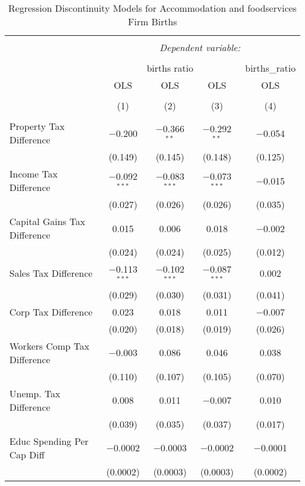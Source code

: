 
\begin{table}[!htbp] \centering 
  \caption{Regression Discontinuity Models for  Accommodation and foodservices Firm Births} 
  \label{72rd} 
\begin{tabular}{@{\extracolsep{5pt}}lcccc} 
\\[-1.8ex]\hline 
\hline \\[-1.8ex] 
 & \multicolumn{4}{c}{\textit{Dependent variable:}} \\ 
\cline{2-5} 
\\[-1.8ex] & \multicolumn{3}{c}{births ratio} & births\_ratio \\ 
 & OLS & OLS & OLS & OLS \\ 
\\[-1.8ex] & (1) & (2) & (3) & (4)\\ 
\hline \\[-1.8ex] 
 Property Tax Difference & $-$0.200 & $-$0.366$^{**}$ & $-$0.292$^{**}$ & $-$0.054 \\ 
  & (0.149) & (0.145) & (0.148) & (0.125) \\ 
  Income Tax Difference & $-$0.092$^{***}$ & $-$0.083$^{***}$ & $-$0.073$^{***}$ & $-$0.015 \\ 
  & (0.027) & (0.026) & (0.026) & (0.035) \\ 
  Capital Gains Tax Difference & 0.015 & 0.006 & 0.018 & $-$0.002 \\ 
  & (0.024) & (0.024) & (0.025) & (0.012) \\ 
  Sales Tax Difference & $-$0.113$^{***}$ & $-$0.102$^{***}$ & $-$0.087$^{***}$ & 0.002 \\ 
  & (0.029) & (0.030) & (0.031) & (0.041) \\ 
  Corp Tax Difference & 0.023 & 0.018 & 0.011 & $-$0.007 \\ 
  & (0.020) & (0.018) & (0.019) & (0.026) \\ 
  Workers Comp Tax Difference & $-$0.003 & 0.086 & 0.046 & 0.038 \\ 
  & (0.110) & (0.107) & (0.105) & (0.070) \\ 
  Unemp. Tax Difference & 0.008 & 0.011 & $-$0.007 & 0.010 \\ 
  & (0.039) & (0.035) & (0.037) & (0.017) \\ 
  Educ Spending Per Cap Diff & $-$0.0002 & $-$0.0003 & $-$0.0002 & $-$0.0001 \\ 
  & (0.0002) & (0.0003) & (0.0003) & (0.0002) \\ 

\end{tabular}
\end{table}
